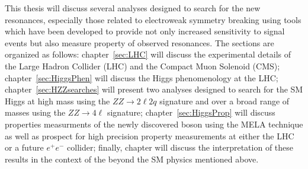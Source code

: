 This thesis will discuss several analyses designed to search for the
new resonances, especially those related to electroweak symmetry 
breaking using tools which have been developed to provide not only 
increased sensitivity to signal events but also measure property of 
observed resonances. 
The sections are organized as follows: chapter~\ref{sec:LHC} will 
discuss the experimental details of the Large Hadron Collider (LHC) and 
the Compact Muon Solenoid (CMS); chapter~\ref{sec:HiggsPhen} will discuss 
the Higgs phenomenology at the LHC; chapter~\ref{sec:HZZsearches} will
present two analyses designed to search for the SM Higgs at high mass
using the $ZZ\to2\ell 2q$ signature and over a broad range of masses
using the $ZZ\to 4\ell$ signature; chapter~\ref{sec:HiggsProp} will discuss
properties measurments of the newly discovered boson using the MELA 
technique as well as prospect for high precision property measurements
at either the LHC or a future $e^+e^-$ collider; finally, chapter will
discuss the interpretation of these results in the context of the 
beyond the SM physics mentioned above.  


